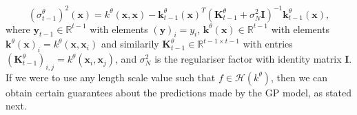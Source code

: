 \documentclass{article}
\theoremstyle{plain}
\theoremstyle{definition}
\theoremstyle{remark}
\theoremstyle{plain}
\begin{document}
\begin{equation*}
    (\sigma^\theta_{t-1})^2(\bm{x}) = k^\theta(\bm{x}, \bm{x}) - \bm{k}^\theta_{t-1}(\bm{x})^T(\mathbf{K}^\theta_{t-1} + \sigma_N^2\mathbf{I})^{-1}\bm{k}^\theta_{t-1}(\bm{x}) ,
\end{equation*}
where $\bm{y}_{t-1} \in \mathbb{R}^{t-1} $ with elements $(\bm{y})_i = y_i$, $\bm{k}^\theta(\bm{x}) \in \mathbb{R}^{t-1}$ with elements $\bm{k}^\theta(\bm{x})_i = k^\theta(\bm{x}, \bm{x}_i)$ and similarily $\mathbf{K}^\theta_{t-1} \in \mathbb{R}^{t-1 \times t-1}$ with entries $(\mathbf{K}^\theta_{t-1})_{i,j} = k^\theta(\bm{x}_i, \bm{x}_j)$, and $\sigma_N^2$ is the regulariser factor \cite{chowdhury2017kernelized} with identity matrix $\mathbf{I}$. If we were to use any length scale value such that $f \in \mathcal{H}\left(k^{\theta}\right)$, then we can obtain certain guarantees about the predictions made by the GP model, as stated next.
\end{document}

